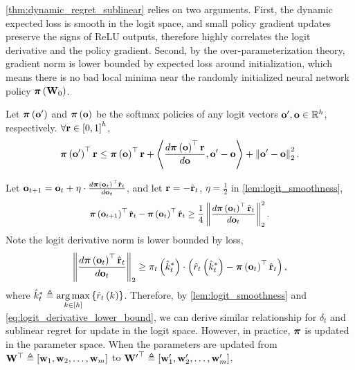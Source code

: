 \cref{thm:dynamic_regret_sublinear} relies on two arguments. First, the dynamic expected loss is smooth in the logit space, and small policy gradient updates preserve the signs of ReLU outputs, therefore highly correlates the logit derivative and the policy gradient. Second, by the over-parameterization theory, gradient norm is lower bounded by expected loss around initialization, which means there is no bad local minima near the randomly initialized neural network policy ${\boldsymbol{\pi}}\left( {\mathbf{W}}_0 \right)$.

\begin{lem}
\label{lem:logit_smoothness}
Let ${\boldsymbol{\pi}}\left( {\mathbf{o}}^\prime \right)$ and ${\boldsymbol{\pi}}\left( {\mathbf{o}} \right)$ be the softmax policies of any logit vectors ${\mathbf{o}}^\prime, {\mathbf{o}} \in {\mathbb{R}}^h$, respectively. $\forall {\mathbf{r}} \in \left[ 0, 1\right]^h$,
\begin{equation*}
    {\boldsymbol{\pi}}\left( {\mathbf{o}}^\prime \right)^\top {\mathbf{r}} \le {\boldsymbol{\pi}}\left( {\mathbf{o}} \right)^\top {\mathbf{r}} + \left\langle \frac{d {\boldsymbol{\pi}}\left( {\mathbf{o}} \right)^\top {\mathbf{r}}}{d {\mathbf{o}}}, {\mathbf{o}}^\prime - {\mathbf{o}} \right\rangle + \left\| {\mathbf{o}}^\prime - {\mathbf{o}} \right\|_2^2.
\end{equation*}
\end{lem}
Let ${\mathbf{o}}_{t+1} = {\mathbf{o}}_{t} + \eta \cdot \frac{d {\boldsymbol{\pi}}\left( {\mathbf{o}}_{t} \right)^\top \hat{{\mathbf{r}}}_t}{d {\mathbf{o}}_{t}}$, and let ${\mathbf{r}} = - \hat{{\mathbf{r}}}_t$, $\eta = \frac{1}{2}$ in \cref{lem:logit_smoothness},
\begin{equation*}
\begin{split}
\small
    \rvpi\left( \rvo_{t+1} \right)^\top \hat{\rvr}_t - \rvpi\left( \rvo_{t} \right)^\top \hat{\rvr}_t \ge\frac{1}{4} \left\| \frac{d \rvpi\left( \rvo_{t} \right)^\top \hat{\rvr}_t}{d \rvo_{t}} \right\|_2^2.
\end{split}
\end{equation*}
Note the logit derivative norm is lower bounded by loss,
\begin{equation}
\label{eq:logit_derivative_lower_bound}
\begin{split}
    \left\| \frac{d {\boldsymbol{\pi}}\left( {\mathbf{o}}_{t} \right)^\top \hat{{\mathbf{r}}}_t}{d {\mathbf{o}}_{t}} \right\|_2 \ge \pi_t\left(\hat{k}_t^*\right) \cdot \left( \hat{r}_t\left(\hat{k}_t^*\right) - {\boldsymbol{\pi}}\left( {\mathbf{o}}_{t} \right)^\top \hat{{\mathbf{r}}}_t \right),
\end{split}
\end{equation}
where $\hat{k}_t^* \triangleq \operatorname*{arg\,max}\limits_{ k \in [h]}{\left\{ \hat{r}_t\left(k\right) \right\}}$. Therefore, by \cref{lem:logit_smoothness} and \cref{eq:logit_derivative_lower_bound}, we can derive similar relationship for $\delta_t$ and sublinear regret for update in the logit space. However, in practice, ${\boldsymbol{\pi}}$ is updated in the parameter space. When the parameters are updated from ${\mathbf{W}}^\top \triangleq \left[ {\mathbf{w}}_1, {\mathbf{w}}_2, \dots, {\mathbf{w}}_m \right]$ to ${{\mathbf{W}}^\prime}^\top \triangleq \left[ {\mathbf{w}}_1^\prime, {\mathbf{w}}_2^\prime, \dots, {\mathbf{w}}_m^\prime \right]$,
